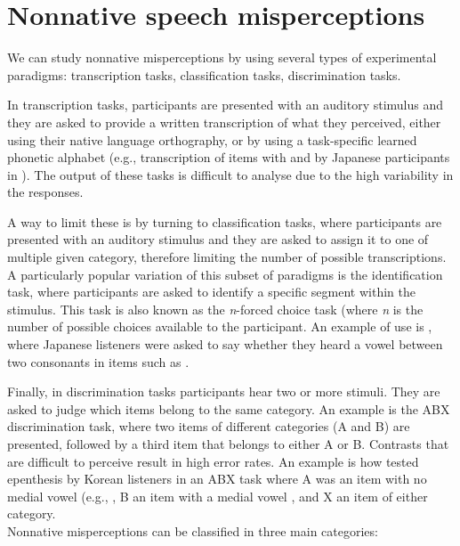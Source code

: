 \section{Nonnative speech misperceptions}

We can study nonnative misperceptions by using several types of experimental paradigms: transcription tasks, classification tasks, discrimination tasks.

In transcription tasks, participants are presented with an auditory stimulus and they are asked to provide a written transcription of what they perceived, either using their native language orthography, or by using a task-specific learned phonetic alphabet (e.g., transcription of items with  and  by Japanese participants in \cite{best1992}). The output of these tasks is difficult to analyse due to the high variability in the responses.

A way to limit these is by turning to classification tasks, where participants are presented with an auditory stimulus and they are asked to assign it to one of multiple given category, therefore limiting the number of possible transcriptions.
A particularly popular variation of this subset of paradigms is the identification task, where participants are asked to identify a specific segment within the stimulus. This task is also known as the \textit{n}-forced choice task (where \textit{n} is the number of possible choices available to the participant. An example of use is \cite{dupoux1999}, where Japanese listeners were asked to say whether they heard a  vowel between two consonants in items such as .

Finally, in discrimination tasks participants hear two or more stimuli. They are asked to judge which items belong to the same category. An example is the ABX discrimination task, where two items of different categories (A and B) are presented, followed by a third item that belongs to either A or B. Contrasts that are difficult to perceive result in high error rates. An example is how \cite{durvasula2015} tested epenthesis by Korean listeners in an ABX task where A was an item with no medial vowel (e.g., , B an item with a medial vowel , and X an item of either category.     \\  

Nonnative misperceptions can be classified in three main categories:

